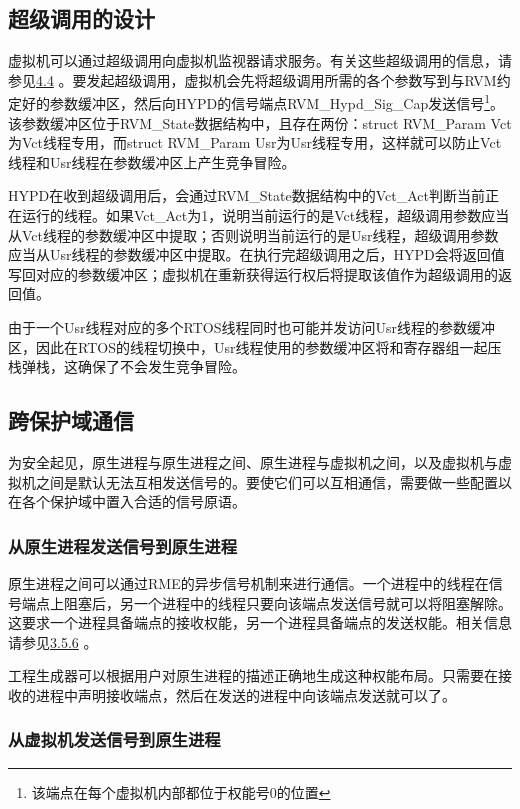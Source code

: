\subsection{超级调用的设计}\label{subsec:2-2-6}

虚拟机可以通过超级调用向虚拟机监视器请求服务。有关这些超级调用的信息，请参见\protect\hyperref[sec:4-4]{4.4}
。要发起超级调用，虚拟机会先将超级调用所需的各个参数写到与RVM约定好的参数缓冲区，然后向HYPD的信号端点RVM\_Hypd\_Sig\_Cap发送信号\footnote{该端点在每个虚拟机内部都位于权能号0的位置}。该参数缓冲区位于RVM\_State数据结构中，且存在两份：struct
RVM\_Param Vct为Vct线程专用，而struct RVM\_Param
Usr为Usr线程专用，这样就可以防止Vct线程和Usr线程在参数缓冲区上产生竞争冒险。

HYPD在收到超级调用后，会通过RVM\_State数据结构中的Vct\_Act判断当前正在运行的线程。如果Vct\_Act为1，说明当前运行的是Vct线程，超级调用参数应当从Vct线程的参数缓冲区中提取；否则说明当前运行的是Usr线程，超级调用参数应当从Usr线程的参数缓冲区中提取。在执行完超级调用之后，HYPD会将返回值写回对应的参数缓冲区；虚拟机在重新获得运行权后将提取该值作为超级调用的返回值。

由于一个Usr线程对应的多个RTOS线程同时也可能并发访问Usr线程的参数缓冲区，因此在RTOS的线程切换中，Usr线程使用的参数缓冲区将和寄存器组一起压栈弹栈，这确保了不会发生竞争冒险。

\subsection{跨保护域通信}\label{subsec:2-2-7}

为安全起见，原生进程与原生进程之间、原生进程与虚拟机之间，以及虚拟机与虚拟机之间是默认无法互相发送信号的。要使它们可以互相通信，需要做一些配置以在各个保护域中置入合适的信号原语。

\subsubsection{从原生进程发送信号到原生进程}\label{subsubsec:2-2-7-1}

原生进程之间可以通过RME的异步信号机制来进行通信。一个进程中的线程在信号端点上阻塞后，另一个进程中的线程只要向该端点发送信号就可以将阻塞解除。这要求一个进程具备端点的接收权能，另一个进程具备端点的发送权能。相关信息请参见\protect\hyperref[subsec:3-5-6]{3.5.6}
。

工程生成器可以根据用户对原生进程的描述正确地生成这种权能布局。只需要在接收的进程中声明接收端点，然后在发送的进程中向该端点发送就可以了。

\subsubsection{从虚拟机发送信号到原生进程}\label{subsubsec:2-2-7-2}

